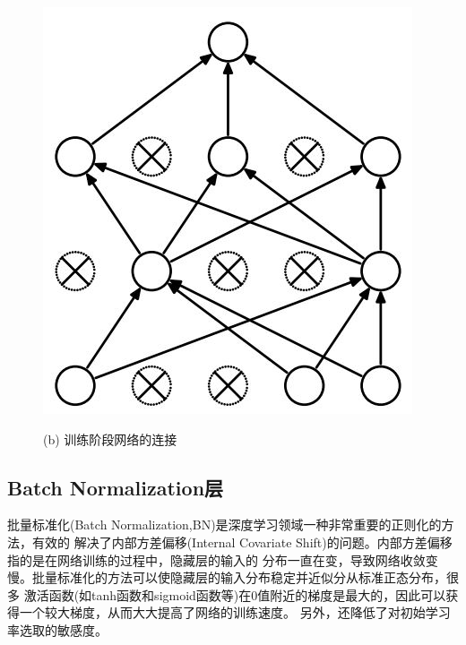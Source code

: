 \begin{figure}[!htp]
\begin{minipage}[t]{0.5\linewidth}
	\includegraphics[width=0.9\linewidth]{figure/chap4/dropout.jpg}    
	\caption*{(b) 训练阶段网络的连接}
	\label{fig:dropout}
\end{minipage}
\label{fig:dropout-connection}
\end{figure}

\subsection{Batch Normalization层}
	批量标准化(Batch Normalization,BN)是深度学习领域一种非常重要的正则化的方法\cite{ioffe2015batch}，有效的
	解决了内部方差偏移(Internal Covariate Shift)的问题。内部方差偏移指的是在网络训练的过程中，隐藏层的输入的
	分布一直在变，导致网络收敛变慢。批量标准化的方法可以使隐藏层的输入分布稳定并近似分从标准正态分布，很多
	激活函数(如tanh函数和sigmoid函数等)在0值附近的梯度是最大的，因此可以获得一个较大梯度，从而大大提高了网络的训练速度。
	另外，还降低了对初始学习率选取的敏感度。
